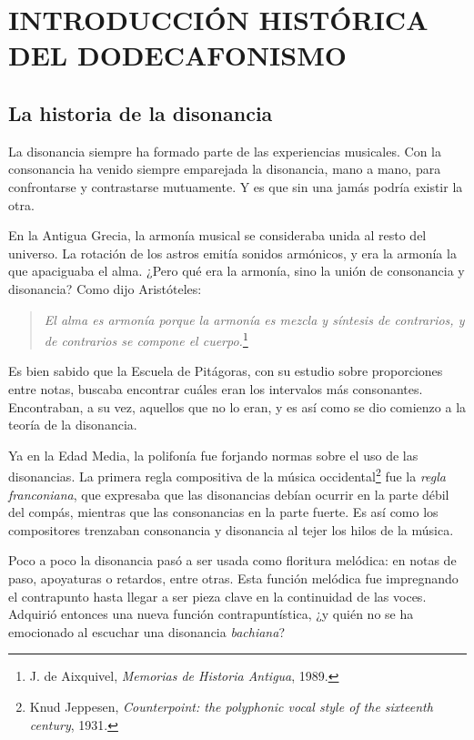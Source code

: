 \section[INTRODUCCI\'ON HIST\'ORICA DEL DODECAFONISMO]{INTRODUCCI\'ON HIST\'ORICA DEL DODECAFONISMO}\label{ch:historia}

\subsection{La historia de la disonancia}
La disonancia siempre ha formado parte de las experiencias musicales. Con la consonancia ha venido siempre emparejada la disonancia, mano a mano, para confrontarse y contrastarse mutuamente. Y es que sin una jam\'as podr\'ia existir la otra.

En la Antigua Grecia, la armon\'ia musical se consideraba unida al resto del universo. La rotaci\'on de los astros emit\'ia sonidos arm\'onicos, y era la armon\'ia la que apaciguaba el alma. ¿Pero qu\'e era la armon\'ia, sino la unión de consonancia y disonancia? Como dijo Arist\'oteles:
\begin{quote}
\emph{El alma es armon\'ia porque la armon\'ia es mezcla y s\'intesis de contrarios, y de contrarios se compone el cuerpo.}\footnote{J. de Aixquivel,
\textit{Memorias de Historia Antigua}, 1989.}
\end{quote}

Es bien sabido que la Escuela de Pit\'agoras, con su estudio sobre proporciones entre notas, buscaba encontrar cu\'ales eran los intervalos m\'as consonantes. Encontraban, a su vez, aquellos que no lo eran, y es as\'i como se dio comienzo a la teor\'ia de la disonancia. 

Ya en la Edad Media, la polifon\'ia fue forjando normas sobre el uso de las disonancias.
La primera regla compositiva de la m\'usica occidental\footnote{Knud Jeppesen, \textit{Counterpoint: the polyphonic vocal style of the sixteenth century},
1931.} fue la \emph{regla franconiana}, que expresaba que
las disonancias deb\'ian ocurrir en la parte d\'ebil del comp\'as, mientras que las consonancias en la parte fuerte. Es as\'i como los compositores trenzaban consonancia y disonancia al tejer los hilos de la m\'usica.

Poco a poco la disonancia pas\'o a ser usada como floritura mel\'odica: en notas de paso, apoyaturas o retardos, entre otras. Esta funci\'on mel\'odica fue impregnando el contrapunto hasta llegar a ser pieza clave en la continuidad de las voces. Adquiri\'o entonces una nueva funci\'on contrapunt\'istica, ¿y qui\'en no se ha emocionado al escuchar una disonancia \textit{bachiana}?

